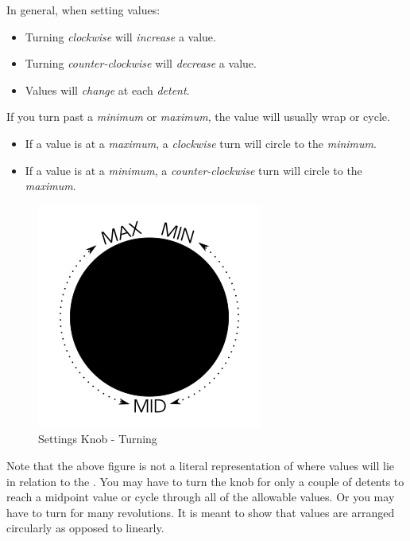 \par\medskip

In general, when setting values:

\begin{itemize}
  \item Turning \textit{clockwise} will \textit{increase} a value.
  \item Turning \textit{counter-clockwise} will \textit{decrease} a value.
  \item Values will \textit{change} at each \textit{detent}.
\end{itemize}

If you turn past a \textit{minimum} or \textit{maximum}, the value will usually
wrap or cycle.

\begin{itemize}
  \item If a value is at a \textit{maximum}, a \textit{clockwise} turn will
    circle to the \textit{minimum}.
  \item If a value is at a \textit{minimum}, a \textit{counter-clockwise} turn
    will circle to the \textit{maximum}.
\end{itemize}

\begin{figure}[H]
\centering
  \includegraphics{images/settings_knob_wrap.png}
\caption{Settings Knob - Turning}
\end{figure}

Note that the above figure is not a literal representation of where values will
lie in relation to the .  You may have to turn the knob for only a couple
of detents to reach a midpoint value or cycle through all of the allowable
values.  Or you may have to turn for many revolutions.  It is meant to show that
values are arranged circularly as opposed to linearly.

